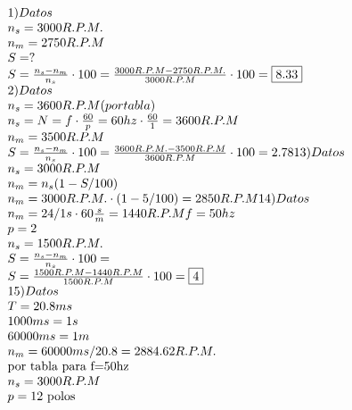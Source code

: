 $
\begin{array}{l}

1)Datos\\
n_s= 3000 R.P.M.\\
n_m=2750 R.P.M\\
S=?\\
S=\frac{n_s-n_m}{n_s}\cdot 100=\frac{3000 R.P.M-2750 R.P.M.}{3000 R.P.M}\cdot 100=\fbox{8.33}\\

2)Datos\\
n_s=3600 R.P.M ( por tabla)\\
n_s=N=f\cdot \frac{60}{p}=60hz \cdot \frac{60}{1} =3600 R.P.M\\
n_m=3500 R.P.M\\
S=\frac{n_s-n_m}{n_s}\cdot 100=\frac{3600 R.P.M.-3500 R.P.M}{3600 R.P.M}\cdot 100=2.78

13) Datos\\
n_s=3000 R.P.M\\
n_m=n_s(1-S/100)\\
n_m=3000R.P.M. \cdot(1-5/100)=2850 R.P.M


14) Datos\\
n_m=24/1s\cdot 60\frac{s}{m}=1440 R.P.M
f=50hz\\
p=2\\
n_s=1500 R.P.M.\\
S=\frac{n_s-n_m}{n_s}\cdot 100=\\
S=\frac{1500 R.P.M-1440 R.P.M}{1500R.P.M}\cdot 100= \fbox{4}\\


15) Datos\\
T=20.8ms\\
1000ms = 1s\\
60000ms=1m
\\
n_m= 60000ms/20.8 = 2884.62R.P.M.\\
\text{por tabla para f=50hz}\\
n_s=3000R.P.M\\
p=1 \text{2 polos}\\
\end{array}
$
